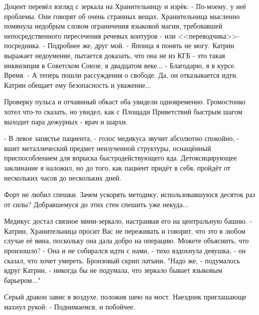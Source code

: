 Доцент перевёл взгляд с зеркала на Хранительницу и изрёк:
 - По-моему, у неё проблемы. Они говорят об очень странных вещах.
Хранительница мысленно помянула недобрым словом ограничения языковой магии,
требовавшей непосредственного пересечения речевых контуров - или <<переводчика>>-посредника.
 - Подробнее же, друг мой.
 - Японца я понять не могу. Катрин выражает недоумение, пытается доказать, что она не из КГБ - это такая инквизиция в Советском Союзе, в двадцатом веке...
 - Благодарю, я в курсе. Время.
 - А теперь пошли рассуждения о свободе. Да, он отказывается идти. Катрин обещает ему безопасность и уважение...

Проверку пульса и отчаянный обкаст оба увидели одновременно. Громостонко хотел что-то сказать, но увидел, как с Площади Приветствий быстрым шагом выходит пара дежурных - врач и шархи.

 - В левое запястье пациента, - голос медикуса звучит абсолютно спокойно, - вшит металлический предмет неизученной структуры, оснащённый приспособлением для впрыска быстродействующего яда. Детоксицирующее заклинание я наложил, но до того, как пациент придёт в себя, пройдёт от нескольких часов до нескольких дней.

Форт не любил спешки. Зачем ускорять методику, использовавшуюся десяток раз от силы? Добравшемуся до этих стен спешить уже некуда...

Медикус достал связное мини-зеркало, настраивая его на центральную башню.
 - Катрин, Хранительница просит Вас не переживать и говорит, что это в любом случае её вина, поскольку она дала добро на операцию. Можете объяснить, что произошло?
 - Она и не собирался идти с нами, - тихо вздохнула девушка, - он сказал, что хочет умереть.
Бронзовый скрип латыни.
"Надо же, - подумалось вдруг Катрин, - никогда бы не подумала, что зеркало бывает языковым барьером..."


Серый дракон завис в воздухе, положив шею на мост. Наездник приглашающе махнул рукой:
 - Поднимаемся, и побойчее.



